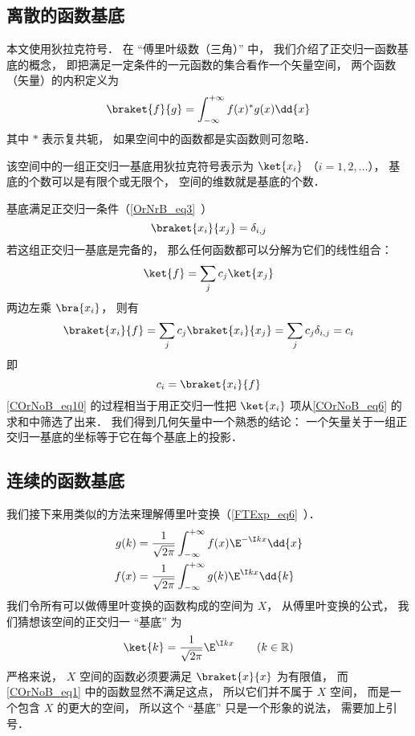 

\subsection{离散的函数基底}
本文使用狄拉克符号． 在 “傅里叶级数（三角）” 中， 我们介绍了正交归一函数基底的概念， 即把满足一定条件的一元函数的集合看作一个矢量空间， 两个函数（矢量）的内积定义为
\begin{equation}
\braket{f}{g} = \int_{-\infty}^{+\infty} f(x)^* g(x) \dd{x}
\end{equation}
其中 $*$ 表示复共轭， 如果空间中的函数都是实函数则可忽略．

该空间中的一组正交归一基底用狄拉克符号表示为 $\ket{x_i}$ （$i = 1, 2,\dots$）， 基底的个数可以是有限个或无限个， 空间的维数就是基底的个数．

基底满足正交归一条件（\autoref{OrNrB_eq3}~）
\begin{equation}\label{COrNoB_eq2}
\braket{x_i}{x_j} = \delta_{i,j}
\end{equation}
若这组正交归一基底是完备的， 那么任何函数都可以分解为它们的线性组合：
\begin{equation}\label{COrNoB_eq6}
\ket{f} = \sum_j c_j\ket{x_j}
\end{equation}
两边左乘 $\bra{x_i}$， 则有
\begin{equation}\label{COrNoB_eq10}
\braket{x_i}{f} = \sum_j c_j\braket{x_i}{x_j} = \sum_j c_j \delta_{i,j} = c_i
\end{equation}
即
\begin{equation}\label{COrNoB_eq5}
c_i = \braket{x_i}{f}
\end{equation}
\autoref{COrNoB_eq10} 的过程相当于用正交归一性把 $\ket{x_i}$ 项从\autoref{COrNoB_eq6} 的求和中筛选了出来． 我们得到几何矢量中一个熟悉的结论： 一个矢量关于一组正交归一基底的坐标等于它在每个基底上的投影．

\subsection{连续的函数基底}
我们接下来用类似的方法来理解傅里叶变换（\autoref{FTExp_eq6}~）．
\begin{align}\label{COrNoB_eq4}
g(k) &= \frac{1}{\sqrt{2\pi }} \int_{-\infty }^{+\infty } f(x)\E^{-\I kx} \dd{x} \\
\label{COrNoB_eq3}f(x) &= \frac{1}{\sqrt{2\pi }} \int_{-\infty }^{+\infty } g(k)\E^{\I kx} \dd{k}
\end{align}
我们令所有可以做傅里叶变换的函数构成的空间为 $X$， 从傅里叶变换的公式， 我们猜想该空间的正交归一 “基底” 为
\begin{equation}\label{COrNoB_eq1}
\ket{k} = \frac{1}{\sqrt{2\pi}} \E^{\I kx} \qquad (k \in \mathbb R)
\end{equation}
严格来说， $X$ 空间的函数必须要满足 $\braket{x}{x}$ 为有限值， 而\autoref{COrNoB_eq1} 中的函数显然不满足这点， 所以它们并不属于 $X$ 空间， 而是一个包含 $X$ 的更大的空间， 所以这个 “基底” 只是一个形象的说法， 需要加上引号．

